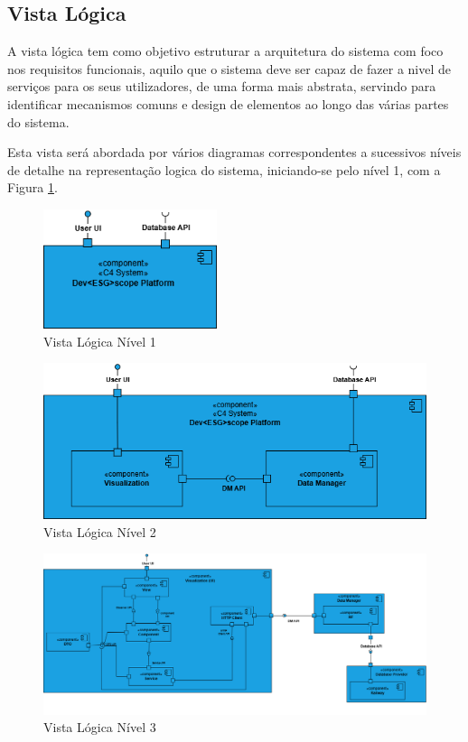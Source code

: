 \subsection{Vista Lógica}

A vista lógica tem como objetivo estruturar a arquitetura do sistema com foco nos requisitos funcionais, aquilo que o sistema deve ser capaz de fazer a nivel de serviços para os seus utilizadores, de uma forma mais abstrata, servindo para identificar mecanismos comuns e design de elementos ao longo das várias partes do sistema.

Esta vista será abordada por vários diagramas correspondentes a sucessivos níveis de detalhe na representação logica do sistema, iniciando-se pelo nível 1, com a Figura \ref{fig:logical_view_lv1}.

\begin{figure}[H]
    \centering
    \includegraphics[width=2in,keepaspectratio]{frontmatter/assets/diagrams/Logical View/Logical View Lv1.drawio.png}
    \caption{Vista Lógica Nível 1}
    \label{fig:logical_view_lv1}
\end{figure}



\begin{figure}[H]
    \centering
    \includegraphics[width=5in,keepaspectratio]{frontmatter/assets/diagrams/Logical View/Logical View Lv2.drawio.png}
    \caption{Vista Lógica Nível 2}
    \label{fig:logical_view_lv2}
\end{figure}


\begin{figure}[H]
    \centering
    \includegraphics[width=6.5in,keepaspectratio]{frontmatter/assets/diagrams/Logical View/Logical View Lv3.drawio.png}
    \caption{Vista Lógica Nível 3}
    \label{fig:logical_view_lv3}
\end{figure}


